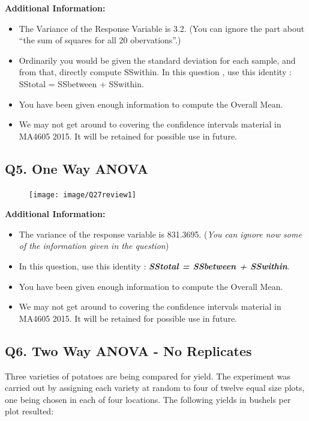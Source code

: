 \documentclass[a4paper,12pt]{article}
\begin{document}
\noindent \textbf{Additional Information: }
\begin{itemize}
	\item The Variance of the Response Variable is 3.2. (You can ignore the part about “the sum of squares for all 20 obervations”.)
	\item  Ordinarily you would be given the standard deviation for each sample, and from that, directly compute SSwithin. In this question , use this identity : SStotal = SSbetween + SSwithin.
	\item  You have been given enough information to compute the Overall Mean.
	\item  We may not get around to covering the confidence intervals material in MA4605 2015. It will be retained for possible use in future.
\end{itemize}
\newpage
\subsection*{Q5. One Way ANOVA }
\begin{figure}[h!]
	\centering
	\texttt{[image: image/Q27review1]}
	
\end{figure}
\noindent \textbf{Additional Information: }
\begin{itemize}
	\item The variance of the response variable is 831.3695. (\textit{You can ignore now some of the information given in the question}) 
	\item  In this question, use this identity : \textbf{\textit{SStotal = SSbetween + SSwithin}}.
	\item  You have been given enough information to compute the Overall Mean.
	\item  We may not get around to covering the confidence intervals material in MA4605 2015. It will be retained for possible use in future.
\end{itemize}
\newpage
\subsection*{Q6. Two Way ANOVA - No Replicates} %

Three varieties of potatoes are being compared for yield. The experiment
was carried out by assigning each variety at random to four of twelve equal size
plots, one being chosen in each of four locations. The following yields in bushels per 
plot resulted:
\end{document}
